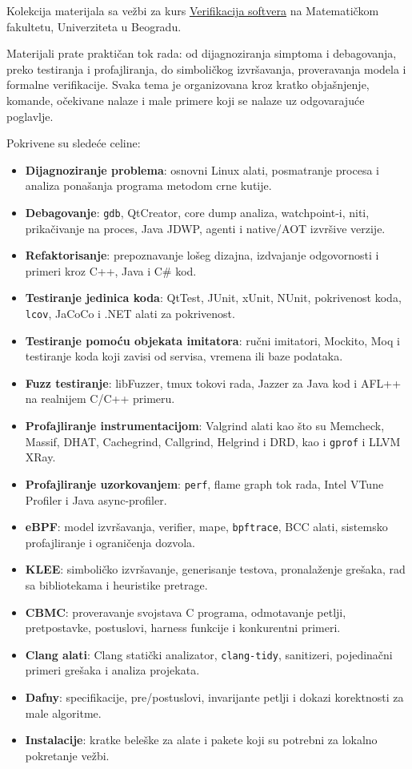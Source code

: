 Kolekcija materijala sa vežbi za kurs \href{http://www.verifikacijasoftvera.matf.bg.ac.rs/}{Verifikacija softvera} na Matematičkom fakultetu, Univerziteta u Beogradu.

Materijali prate praktičan tok rada: od dijagnoziranja simptoma i debagovanja, preko testiranja i profajliranja, do simboličkog izvršavanja, proveravanja modela i formalne verifikacije. Svaka tema je organizovana kroz kratko objašnjenje, komande, očekivane nalaze i male primere koji se nalaze uz odgovarajuće poglavlje.

Pokrivene su sledeće celine:

\begin{itemize}
\tightlist
\item
  \textbf{Dijagnoziranje problema}: osnovni Linux alati, posmatranje procesa i analiza ponašanja programa metodom crne kutije.
\item
  \textbf{Debagovanje}: \texttt{gdb}, QtCreator, core dump analiza, watchpoint-i, niti, prikačivanje na proces, Java JDWP, agenti i native/AOT izvršive verzije.
\item
  \textbf{Refaktorisanje}: prepoznavanje lošeg dizajna, izdvajanje odgovornosti i primeri kroz C++, Java i C\# kod.
\item
  \textbf{Testiranje jedinica koda}: QtTest, JUnit, xUnit, NUnit, pokrivenost koda, \texttt{lcov}, JaCoCo i .NET alati za pokrivenost.
\item
  \textbf{Testiranje pomoću objekata imitatora}: ručni imitatori, Mockito, Moq i testiranje koda koji zavisi od servisa, vremena ili baze podataka.
\item
  \textbf{Fuzz testiranje}: libFuzzer, tmux tokovi rada, Jazzer za Java kod i AFL++ na realnijem C/C++ primeru.
\item
  \textbf{Profajliranje instrumentacijom}: Valgrind alati kao što su Memcheck, Massif, DHAT, Cachegrind, Callgrind, Helgrind i DRD, kao i \texttt{gprof} i LLVM XRay.
\item
  \textbf{Profajliranje uzorkovanjem}: \texttt{perf}, flame graph tok rada, Intel VTune Profiler i Java async-profiler.
\item
  \textbf{eBPF}: model izvršavanja, verifier, mape, \texttt{bpftrace}, BCC alati, sistemsko profajliranje i ograničenja dozvola.
\item
  \textbf{KLEE}: simboličko izvršavanje, generisanje testova, pronalaženje grešaka, rad sa bibliotekama i heuristike pretrage.
\item
  \textbf{CBMC}: proveravanje svojstava C programa, odmotavanje petlji, pretpostavke, postuslovi, harness funkcije i konkurentni primeri.
\item
  \textbf{Clang alati}: Clang statički analizator, \texttt{clang-tidy}, sanitizeri, pojedinačni primeri grešaka i analiza projekata.
\item
  \textbf{Dafny}: specifikacije, pre/postuslovi, invarijante petlji i dokazi korektnosti za male algoritme.
\item
  \textbf{Instalacije}: kratke beleške za alate i pakete koji su potrebni za lokalno pokretanje vežbi.
\end{itemize}
